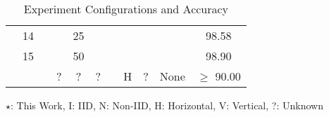 \begin{landscape}
\begin{table}
\begin{tabular}{c|c|c|c|c|c|c|c|c|c|c}
                                                                                            & 14                  &                                                     &                            & 25                       &                         &                                &                    &                    &                        & 98.58 \\ \cline{2-2}\cline{11-11}\cline{5-5}
                                                                                            & 15                  &                                                     &                            & 50                       &                         &                                &                    &                    &                        & 98.90 \\ \cline{2-6}\cline{8-11}
                                                                                            &                     & \cite{10.48550/arxiv.2011.07516}                    & ?                          & ?                        & ?                       &                                & H                  & ?                  & None                   & $\geq$ 90.00 \\ \hline
\end{tabular}

\caption{Experiment Configurations and Accuracy}
\label{tab:experiments}
\end{table}


\begin{table}
\ContinuedFloat

{ \small $\star$: This Work, I: IID, N: Non-IID, H: Horizontal, V: Vertical, ?: Unknown \vspace{12pt} }


\end{table}
\end{landscape}
